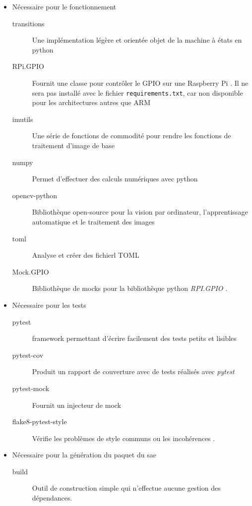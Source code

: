 \begin{itemize}
    \item Nécessaire pour le fonctionnement
          \begin{description}
              \item[transitions] Une implémentation légère et orientée objet de la machine à états en \gls{python} \cite{transition}
              \item[RPi.GPIO] Fournit une classe pour contrôler le GPIO sur une Raspberry Pi \cite{rpi_gpio}.
                  {\color{red}Il ne sera pas installé avec le fichier \verb=requirements.txt=, car non disponible pour
                  les architectures autres que ARM}
              \item[imutils] Une série de fonctions de commodité pour rendre les fonctions de traitement d'image de
                  base \cite{imutils}
              \item[numpy] Permet d’effectuer des calculs numériques avec \gls{python} \cite{numpy}
              \item[opencv-python] Bibliothèque open-source pour la vision par ordinateur, l'apprentissage automatique
                  et le traitement des images \cite{opencv}
              \item[toml] Analyse et créer des fichierl TOML \cite{toml}
              \item[Mock.GPIO] Bibliothèque de \glspl{mock} pour la bibliothèque \gls{python} \textit{RPI.GPIO} \cite{mock_gpio}.
          \end{description}

    \item Nécessaire pour les tests
          \begin{description}
              \item[pytest] \Gls{framework} permettant d'écrire facilement des tests petits et lisibles \cite{pytest}
              \item[pytest-cov] Produit un rapport de couverture avec de tests réalisés avec \textit{pytest} \cite{pytest_cov}
              \item[pytest-mock] Fournit un injecteur de \gls{mock} \cite{pytest_mock}
              \item[flake8-pytest-style]
                  Vérifie les problèmes de style communs ou les incohérences \cite{flake8_pytest_style}.
          \end{description}

    \item Nécessaire pour la génération du \gls{paquet} du \gls{sae}
          \begin{description}
              \item[build] Outil de construction simple qui n'effectue aucune gestion des dépendances. \cite{build}
          \end{description}
\end{itemize}


